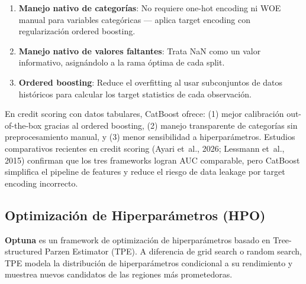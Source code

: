 \documentclass[
  spanish,
  11pt,
  letterpaper,
]{scrbook}
\providecommand{\tightlist}{%
  \setlength{\itemsep}{0pt}\setlength{\parskip}{0pt}}
\theoremstyle{plain}
\theoremstyle{remark}
\begin{document}
\begin{enumerate}
\def\labelenumi{\arabic{enumi}.}
\tightlist
\item
  \textbf{Manejo nativo de categorías}: No requiere one-hot encoding ni
  WOE manual para variables categóricas --- aplica target encoding con
  regularización ordered boosting.
\item
  \textbf{Manejo nativo de valores faltantes}: Trata NaN como un valor
  informativo, asignándolo a la rama óptima de cada split.
\item
  \textbf{Ordered boosting}: Reduce el overfitting al usar subconjuntos
  de datos históricos para calcular los target statistics de cada
  observación.
\end{enumerate}

\begin{tcolorbox}[enhanced jigsaw, arc=.35mm, bottomrule=.15mm, bottomtitle=1mm, breakable, colback=white, colbacktitle=quarto-callout-note-color!10!white, colframe=quarto-callout-note-color-frame, coltitle=black, left=2mm, leftrule=.75mm, opacityback=0, opacitybacktitle=0.6, rightrule=.15mm, title=\textcolor{quarto-callout-note-color}{\faInfo}\hspace{0.5em}{¿Por qué CatBoost y no XGBoost o LightGBM?}, titlerule=0mm, toprule=.15mm, toptitle=1mm]

En credit scoring con datos tabulares, CatBoost ofrece: (1) mejor
calibración out-of-the-box gracias al ordered boosting, (2) manejo
transparente de categorías sin preprocesamiento manual, y (3) menor
sensibilidad a hiperparámetros. Estudios comparativos recientes en
credit scoring (Ayari et~al., 2026; {Lessmann et~al.}, 2015) confirman
que los tres frameworks logran AUC comparable, pero CatBoost simplifica
el pipeline de features y reduce el riesgo de data leakage por target
encoding incorrecto.

\end{tcolorbox}

\subsection{Optimización de Hiperparámetros
(HPO)}\label{optimizaciuxf3n-de-hiperparuxe1metros-hpo}

\textbf{Optuna} es un framework de optimización de hiperparámetros
basado en Tree-structured Parzen Estimator (TPE). A diferencia de grid
search o random search, TPE modela la distribución de hiperparámetros
condicional a su rendimiento y muestrea nuevos candidatos de las
regiones más prometedoras.
\end{document}

